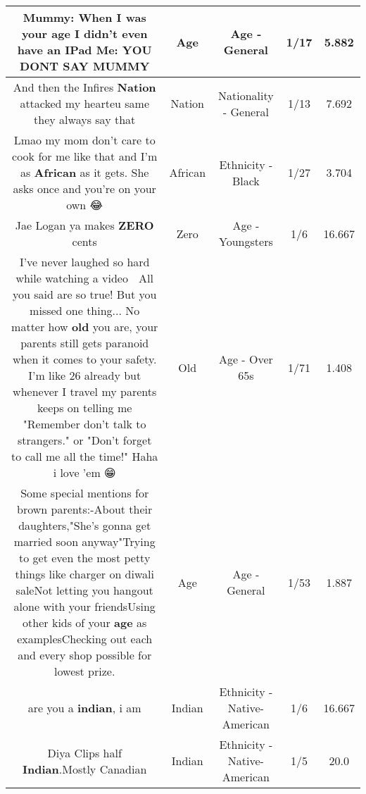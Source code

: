 \documentclass[11pt]{article}
\newlength\mylength
\begin{document}
\begin{center}
\begin{longtable}{|C{.65\mylength}|C{.30\mylength}|C{.12\mylength}|C{.12\mylength}|C{.12\mylength}|}
  \small Mummy: When I was your \textbf{age} I didn't even have an IPad Me: YOU DONT SAY MUMMY\normalsize   & Age & Age - General & 1/17 & 5.882 \\  \hline
  \small And then the Infires \textbf{Nation} attacked my hearteu same they always say that\normalsize   & Nation & Nationality - General & 1/13 & 7.692 \\  \hline
  \small Lmao my mom don't care to cook for me like that and I'm as \textbf{African} as it gets. She asks once and you're on your own 😂\normalsize   & African & Ethnicity - Black & 1/27 & 3.704 \\  \hline
  \small Jae Logan ya makes \textbf{ZERO} cents\normalsize   & Zero & Age - Youngsters & 1/6 & 16.667 \\  \hline
  \small I've never laughed so hard while watching a video 🤣 All you said are so true! But you missed one thing... No matter how \textbf{old} you are, your parents still gets paranoid when it comes to your safety. I'm like 26 already but whenever I travel my parents keeps on telling me "Remember don't talk to strangers." or "Don't forget to call me all the time!" Haha i love 'em 😁\normalsize   & Old & Age - Over 65s & 1/71 & 1.408 \\  \hline
  \small Some special mentions for brown parents:-About their daughters,"She's gonna get married soon anyway"Trying to get even the most petty things like charger on diwali saleNot letting you hangout alone with your friendsUsing other kids of your \textbf{age} as examplesChecking out each and every shop possible for lowest prize.\normalsize   & Age & Age - General & 1/53 & 1.887 \\  \hline
  \small are you a \textbf{indian}, i am\normalsize   & Indian & Ethnicity - Native-American & 1/6 & 16.667 \\  \hline
  \small Diya Clips half \textbf{Indian}.Mostly Canadian\normalsize   & Indian & Ethnicity - Native-American & 1/5 & 20.0 \\  \hline

\end{longtable}
\end{center}
\end{document}
